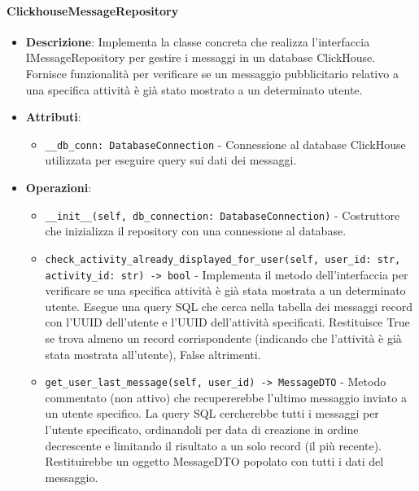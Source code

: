 \documentclass[10pt]{article}
\begin{document}
    \paragraph{ClickhouseMessageRepository}
    \begin{itemize} 
    \item \textbf{Descrizione}: Implementa la classe concreta che realizza l'interfaccia IMessageRepository per gestire i messaggi in un database ClickHouse. Fornisce funzionalità per verificare se un messaggio pubblicitario relativo a una specifica attività è già stato mostrato a un determinato utente.
    \item \textbf{Attributi}:
    \begin{itemize}
        \item \texttt{\_\_db\_conn: DatabaseConnection} - Connessione al database ClickHouse utilizzata per eseguire query sui dati dei messaggi.
    \end{itemize}
    
    \item \textbf{Operazioni}:
    \begin{itemize}
        \item \texttt{\_\_init\_\_(self, db\_connection: DatabaseConnection)} - Costruttore che inizializza il repository con una connessione al database.
        
        \item \texttt{check\_activity\_already\_displayed\_for\_user(self, user\_id: str, activity\_id: str) -> bool} - Implementa il metodo dell'interfaccia per verificare se una specifica attività è già stata mostrata a un determinato utente. Esegue una query SQL che cerca nella tabella dei messaggi record con l'UUID dell'utente e l'UUID dell'attività specificati. Restituisce True se trova almeno un record corrispondente (indicando che l'attività è già stata mostrata all'utente), False altrimenti.
        
        \item \texttt{get\_user\_last\_message(self, user\_id) -> MessageDTO} - Metodo commentato (non attivo) che recupererebbe l'ultimo messaggio inviato a un utente specifico. La query SQL cercherebbe tutti i messaggi per l'utente specificato, ordinandoli per data di creazione in ordine decrescente e limitando il risultato a un solo record (il più recente). Restituirebbe un oggetto MessageDTO popolato con tutti i dati del messaggio.
    \end{itemize}
    \end{itemize}
\end{document}
